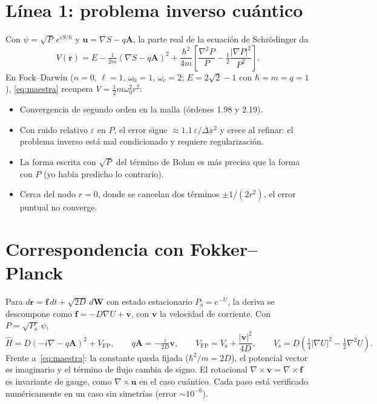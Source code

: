 \documentclass[11pt,a4paper]{article}
\newcommand{\rv}{\mathbf{r}}
\newcommand{\uv}{\mathbf{u}}
\newcommand{\vv}{\mathbf{v}}
\newcommand{\fv}{\mathbf{f}}
\newcommand{\Av}{\mathbf{A}}
\newcommand{\grad}{\nabla}
\newcommand{\Ps}{P_{\mathrm{s}}}
\newcommand{\Vfp}{V_{\mathrm{FP}}}
\newcommand{\Vs}{V_{\mathrm{s}}}
\newcommand{\Hop}{\hat{H}}
\begin{document}
\section{L\'inea 1: problema inverso cu\'antico}
Con $\psi=\sqrt{P}\,e^{iS/\hbar}$ y $\uv=\grad S-q\Av$, la parte real de la ecuaci\'on de Schr\"odinger da
\begin{equation}
  V(\rv)=E-\tfrac{1}{2m}(\grad S-q\Av)^2
        +\frac{\hbar^2}{4m}\!\left[\frac{\grad^2 P}{P}-\tfrac12\frac{|\grad P|^2}{P^2}\right].
  \label{eq:maestra}
\end{equation}
En Fock--Darwin ($n=0$, $\ell=1$, $\omega_0=1$, $\omega_c=2$; $E=2\sqrt2-1$ con $\hbar=m=q=1$),
\eqref{eq:maestra} recupera $V=\tfrac12 m\omega_0^2r^2$:
\begin{itemize}[leftmargin=1.6em]
  \item Convergencia de segundo orden en la malla (\'ordenes 1.98 y 2.19).
  \item Con ruido relativo $\varepsilon$ en $P$, el error sigue $\approx 1.1\,\varepsilon/\Delta x^2$ y crece al
        refinar: el problema inverso est\'a mal condicionado y requiere regularizaci\'on.
  \item La forma escrita con $\sqrt P$ del t\'ermino de Bohm es m\'as precisa que la forma con $P$ (yo
        hab\'ia predicho lo contrario).
  \item Cerca del nodo $r=0$, donde se cancelan dos t\'erminos $\pm1/(2r^2)$, el error puntual no converge.
\end{itemize}

\section{Correspondencia con Fokker--Planck}
Para $d\rv=\fv\,dt+\sqrt{2D}\,d\mathbf W$ con estado estacionario $\Ps=e^{-U}$, la deriva se descompone como
$\fv=-D\grad U+\vv$, con $\vv$ la velocidad de corriente. Con $P=\sqrt{\Ps}\,\psi$,
\begin{equation}
  \Hop=D(-i\grad-q\Av)^2+\Vfp,\qquad q\Av=-\tfrac{i}{2D}\vv,\qquad \Vfp=\Vs+\frac{|\vv|^2}{4D},
  \qquad \Vs=D\!\left(\tfrac14|\grad U|^2-\tfrac12\grad^2U\right).
\end{equation}
Frente a~\eqref{eq:maestra}: la constante queda fijada ($\hbar^2/m=2D$), el potencial vector es imaginario y el
t\'ermino de flujo cambia de signo. El rotacional $\grad\times\vv=\grad\times\fv$ es invariante de gauge, como
$\grad\times\uv$ en el caso cu\'antico. Cada paso est\'a verificado num\'ericamente en un caso sin simetr\'ias
(error $\sim10^{-6}$).
\end{document}
